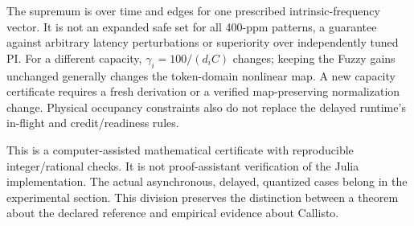 The supremum is over time and edges for one prescribed intrinsic-frequency
vector. It is not an expanded safe set for all 400-ppm patterns, a guarantee
against arbitrary latency perturbations or superiority over independently
tuned PI. For a different capacity, $\gamma_i=100/(d_iC)$ changes; keeping
the Fuzzy gains unchanged generally changes the token-domain nonlinear
map. A new capacity certificate requires a fresh derivation or a verified
map-preserving normalization change. Physical occupancy constraints also
do not replace the delayed runtime's in-flight and credit/readiness rules.

This is a computer-assisted mathematical certificate with reproducible
integer/rational checks. It is not proof-assistant verification of the
Julia implementation. The actual asynchronous, delayed, quantized cases
belong in the experimental section. This division preserves the distinction
between a theorem about the declared reference and empirical evidence
about Callisto.

